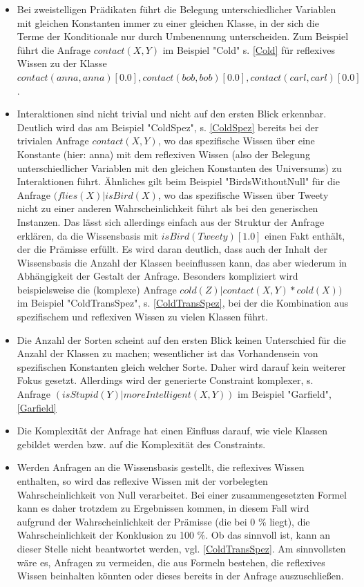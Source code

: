 \documentclass[a4paper, 11pt]{book}
\begin{document}
\begin{itemize}
	\item Bei zweistelligen Prädikaten führt die Belegung unterschiedlicher Variablen mit gleichen Konstanten immer zu einer gleichen Klasse, in der sich die Terme der Konditionale nur durch Umbenennung unterscheiden. Zum Beispiel führt die Anfrage $ contact(X,Y) $ im Beispiel "{}Cold"{} s. \ref{Cold} für reflexives Wissen zu der Klasse $ contact(anna,anna)[0.0], contact(bob,bob)[0.0] , contact(carl,carl)[0.0]  $.
	\item Interaktionen sind nicht trivial und nicht auf den ersten Blick erkennbar. Deutlich wird das am Beispiel "{}ColdSpez"{}, s. \ref{ColdSpez} bereits bei der trivialen Anfrage $ contact(X,Y) $, wo das spezifische Wissen über eine Konstante (hier: anna) mit dem reflexiven Wissen (also der Belegung unterschiedlicher Variablen mit den gleichen Konstanten des Universums) zu Interaktionen führt. Ähnliches gilt beim Beispiel "{}BirdsWithoutNull"{} für die Anfrage $ (flies(X) | isBird(X) $, wo das spezifische Wissen über Tweety nicht zu einer anderen Wahrscheinlichkeit führt als bei den generischen Instanzen. Das lässt sich allerdings einfach aus der Struktur der Anfrage erklären, da die Wissensbasis mit $ isBird(Tweety)[1.0] $ einen Fakt enthält, der die Prämisse erfüllt. Es wird daran deutlich, dass auch der Inhalt der Wissensbasis die Anzahl der Klassen beeinflussen kann, das aber wiederum in Abhängigkeit der Gestalt der Anfrage. Besonders kompliziert wird beispielsweise die (komplexe) Anfrage $ cold(Z)|contact(X,Y) * cold(X)) $ im Beispiel "{}ColdTransSpez"{}, s. \ref{ColdTransSpez}, bei der die Kombination aus spezifischem und reflexiven Wissen zu vielen Klassen führt.
	\item Die Anzahl der Sorten scheint auf den ersten Blick keinen Unterschied für die Anzahl der Klassen zu machen; wesentlicher ist das Vorhandensein von spezifischen Konstanten gleich welcher Sorte. Daher wird darauf kein weiterer Fokus gesetzt. Allerdings wird der generierte Constraint komplexer, s. Anfrage $ (isStupid(Y)|moreIntelligent(X,Y)) $ im Beispiel "{}Garfield"{}, \ref{Garfield}
	\item Die Komplexität der Anfrage hat einen Einfluss darauf, wie viele Klassen gebildet werden bzw. auf die Komplexität des Constraints. 	
	\item Werden Anfragen an die Wissensbasis gestellt, die reflexives Wissen enthalten, so wird das reflexive Wissen mit der vorbelegten Wahrscheinlichkeit von Null verarbeitet. Bei einer zusammengesetzten Formel kann es daher trotzdem zu Ergebnissen kommen, in diesem Fall wird aufgrund der Wahrscheinlichkeit der Prämisse (die bei 0 \% liegt), die Wahrscheinlichkeit der Konklusion zu 100 \%. Ob das sinnvoll ist, kann an dieser Stelle nicht beantwortet werden, vgl. \ref{ColdTransSpez}. Am sinnvollsten wäre es, Anfragen zu vermeiden, die aus Formeln bestehen, die reflexives Wissen beinhalten könnten oder dieses bereits in der Anfrage auszuschließen. 
	
\end{itemize}
\end{document}
